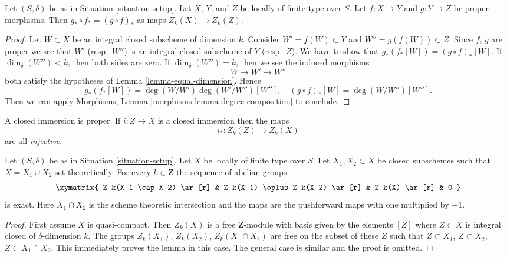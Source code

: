 \begin{lemma}
\label{lemma-compose-pushforward}
Let $(S, \delta)$ be as in Situation \ref{situation-setup}.
Let $X$, $Y$, and $Z$ be locally of finite type over $S$.
Let $f : X \to Y$ and $g : Y \to Z$ be proper morphisms.
Then $g_* \circ f_* = (g \circ f)_*$ as maps $Z_k(X) \to Z_k(Z)$.
\end{lemma}

\begin{proof}
Let $W \subset X$ be an integral closed subscheme of dimension $k$.
Consider $W' = f(W) \subset Y$ and $W'' = g(f(W)) \subset Z$.
Since $f$, $g$ are proper we see that $W'$ (resp.\ $W''$) is
an integral closed subscheme of $Y$ (resp.\ $Z$).
We have to show that $g_*(f_*[W]) = (g \circ f)_*[W]$.
If $\dim_\delta(W'') < k$, then both sides are zero.
If $\dim_\delta(W'') = k$, then we see the induced morphisms
$$
W \longrightarrow
W' \longrightarrow
W''
$$
both satisfy the hypotheses of Lemma \ref{lemma-equal-dimension}. Hence
$$
g_*(f_*[W]) = \deg(W/W')\deg(W'/W'')[W''],
\quad
(g \circ f)_*[W] = \deg(W/W'')[W''].
$$
Then we can apply
Morphisms, Lemma \ref{morphisms-lemma-degree-composition}
to conclude.
\end{proof}

\noindent
A closed immersion is proper. If $i : Z \to X$ is a closed immersion
then the maps
$$
i_* : Z_k(Z) \longrightarrow Z_k(X)
$$
are all {\it injective}.

\begin{lemma}
\label{lemma-exact-sequence-closed}
Let $(S, \delta)$ be as in Situation \ref{situation-setup}.
Let $X$ be locally of finite type over $S$. Let $X_1, X_2 \subset X$
be closed subschemes such that $X = X_1 \cup X_2$ set theoretically.
For every $k \in \mathbf{Z}$ the sequence of abelian groups
$$
\xymatrix{
Z_k(X_1 \cap X_2) \ar[r] &
Z_k(X_1) \oplus Z_k(X_2) \ar[r] &
Z_k(X) \ar[r] &
0
}
$$
is exact. Here $X_1 \cap X_2$ is the scheme theoretic intersection and
the maps are the pushforward maps with one multiplied by $-1$.
\end{lemma}

\begin{proof}
First assume $X$ is quasi-compact. Then $Z_k(X)$ is a free $\mathbf{Z}$-module
with basis given by the elements $[Z]$ where $Z \subset X$ is integral
closed of $\delta$-dimension $k$. The groups
$Z_k(X_1)$, $Z_k(X_2)$, $Z_k(X_1 \cap X_2)$ are free on the subset of these
$Z$ such that $Z \subset X_1$, $Z \subset X_2$, $Z \subset X_1 \cap X_2$.
This immediately proves the lemma in this case. The general case is similar
and the proof is omitted.
\end{proof}

